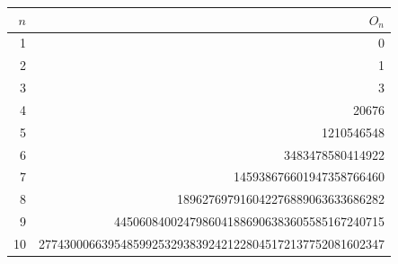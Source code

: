 \begin{tabular}{rr}
\toprule
$n$ & $O_n$ \\
\midrule
1 & 0 \\
2 & 1 \\
3 & 3 \\
4 & 20676 \\
5 & 1210546548 \\
6 & 3483478580414922 \\
7 & 145938676601947358766460 \\
8 & 189627697916042276889063633686282 \\
9 & 4450608400247986041886906383605585167240715 \\
10 & 2774300066395485992532938392421228045172137752081602347 \\
\bottomrule
\end{tabular}
